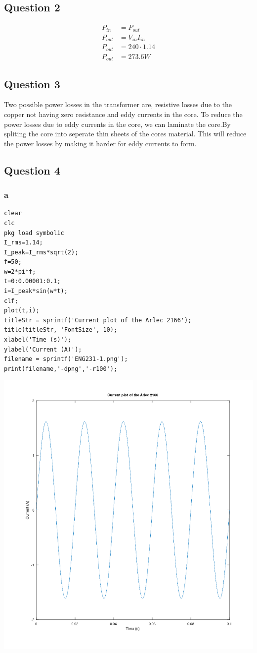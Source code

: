 \documentclass[11pt]{article}
\begin{document}
\subsection{Question 2}
\label{sec:org6f479bb}
\begin{align*}
P_{in}&=P_{out} \\
P_{out}&=V_{in}I_{in} \\
P_{out}&=240\cdot 1.14 \\
P_{out}&=273.6W
\end{align*}
\subsection{Question 3}
\label{sec:org3deec9a}
Two possible power losses in the transformer are, resistive losses due to the copper not having zero resistance and eddy currents in the core.
To reduce the power losses due to eddy currents in the core, we can laminate the core.By spliting the core into seperate thin sheets of the cores material. This will reduce the power losses by making it harder for eddy currents to form.
\subsection{Question 4}
\label{sec:org82a0762}
\subsubsection{a}
\label{sec:org45aeab8}
\begin{verbatim}
clear
clc
pkg load symbolic
I_rms=1.14;
I_peak=I_rms*sqrt(2);
f=50;
w=2*pi*f;
t=0:0.00001:0.1;
i=I_peak*sin(w*t);
clf;
plot(t,i);
titleStr = sprintf('Current plot of the Arlec 2166');
title(titleStr, 'FontSize', 10);
xlabel('Time (s)');
ylabel('Current (A)');
filename = sprintf('ENG231-1.png');
print(filename,'-dpng','-r100');
\end{verbatim}


\begin{center}
\includegraphics[width=.9\linewidth]{ENG231-1.png}
\end{center}
\end{document}

